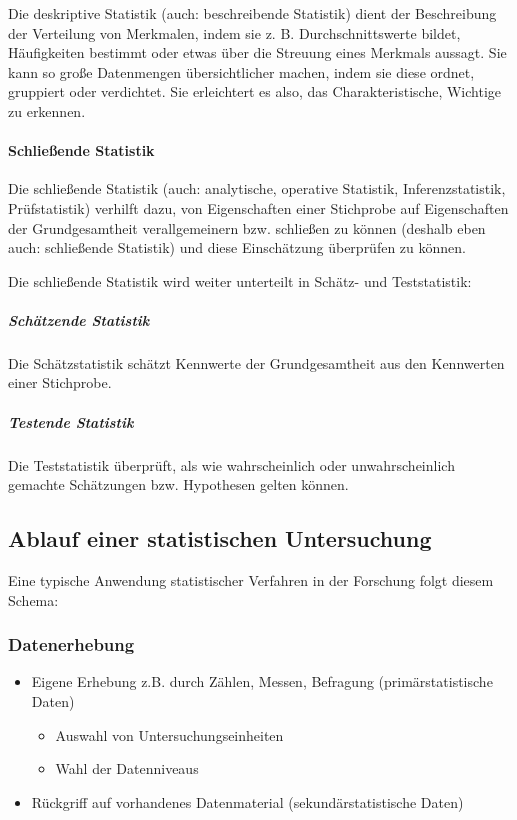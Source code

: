 \documentclass[
  11pt,
  ngerman,
  a4paper,
]{report}
\providecommand{\tightlist}{%
  \setlength{\itemsep}{0pt}\setlength{\parskip}{0pt}}
\begin{document}
Die deskriptive Statistik (auch: beschreibende Statistik) dient der Beschreibung der Verteilung von Merkmalen, indem sie z. B. Durchschnittswerte bildet, Häufigkeiten bestimmt oder etwas über die Streuung eines Merkmals aussagt. Sie kann so große Datenmengen übersichtlicher machen, indem sie diese ordnet, gruppiert oder verdichtet. Sie erleichtert es also, das Charakteristische, Wichtige zu erkennen.

\hypertarget{schlieuxdfende-statistik}{%
\paragraph{Schließende Statistik}\label{schlieuxdfende-statistik}}

Die schließende Statistik (auch: analytische, operative Statistik, Inferenzstatistik, Prüfstatistik) verhilft dazu, von Eigenschaften einer Stichprobe auf Eigenschaften der Grundgesamtheit verallgemeinern bzw. schließen zu können (deshalb eben auch: schließende Statistik) und diese Einschätzung überprüfen zu können.

Die schließende Statistik wird weiter unterteilt in Schätz- und Teststatistik:

\hypertarget{schuxe4tzende-statistik}{%
\subparagraph{Schätzende Statistik}\label{schuxe4tzende-statistik}}

Die Schätzstatistik schätzt Kennwerte der Grundgesamtheit aus den Kennwerten einer Stichprobe.

\hypertarget{testende-statistik}{%
\subparagraph{Testende Statistik}\label{testende-statistik}}

Die Teststatistik überprüft, als wie wahrscheinlich oder unwahrscheinlich gemachte Schätzungen bzw. Hypothesen gelten können.

\hypertarget{ablauf-einer-statistischen-untersuchung}{%
\subsection{Ablauf einer statistischen Untersuchung}\label{ablauf-einer-statistischen-untersuchung}}

Eine typische Anwendung statistischer Verfahren in der Forschung folgt diesem Schema:

\hypertarget{datenerhebung}{%
\subsubsection{Datenerhebung}\label{datenerhebung}}

\begin{itemize}
\tightlist
\item
  Eigene Erhebung z.B. durch Zählen, Messen, Befragung (primärstatistische Daten)

  \begin{itemize}
  \tightlist
  \item
    Auswahl von Untersuchungseinheiten
  \item
    Wahl der Datenniveaus
  \end{itemize}
\item
  Rückgriff auf vorhandenes Datenmaterial (sekundärstatistische Daten)
\end{itemize}
\end{document}
